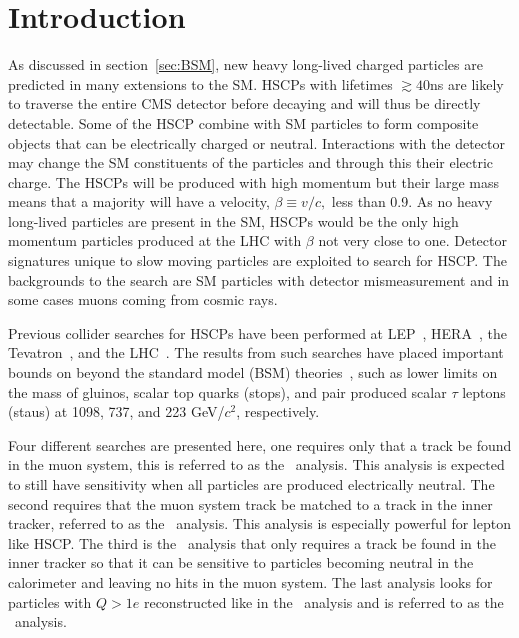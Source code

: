 \section{Introduction}
As discussed in section~\ref{sec:BSM}, new heavy long-lived charged particles are predicted in many extensions to the SM. HSCPs with
lifetimes $\gtrsim 40$ns are likely to traverse the entire CMS detector before decaying and will thus be directly detectable.
Some of the HSCP combine with SM particles to form composite objects that can be electrically charged or neutral.
Interactions with the detector may change the SM constituents of the particles and through this their electric charge.
The HSCPs will be produced with high momentum but their large mass means that
a majority will have a velocity, $\beta \equiv v/c,$ less than 0.9. 
As no heavy long-lived particles are present in the SM, HSCPs would be the only high momentum particles produced at the LHC with $\beta$ not very close to one.
Detector signatures unique to slow moving particles are exploited to search for HSCP. 
The backgrounds to the search are SM particles with detector mismeasurement and in some cases
muons coming from cosmic rays.

Previous collider searches for HSCPs have been performed at LEP~\cite{Barate:1997dr, Abreu:2000tn, Achard:2001qw, Abbiendi:2003yd}, HERA~\cite{Aktas:2004pq},
the Tevatron~\cite{Abazov:2008qu, Aaltonen:2009kea, Abazov:2011pf,Abazov:2012ab},
and the LHC~\cite{Khachatryan:2011ts, Aad:2011mb,  Aad:2011yf, Aad:2011hz, Chatrchyan::2012dr, Chatrchyan:2012sp, Aad:2012vd, ATLASmCHAMPs}.
The results from such searches have placed important bounds on beyond the standard model (BSM) theories~\cite{Berger:2008cq, CahillRowley:2012kx}, such as lower limits on the
mass of gluinos, scalar top quarks (stops), and pair produced scalar $\tau$ leptons (staus) at 1098,
737, and 223 GeV/$c^2$, respectively.

Four different searches are presented here, one requires only that a track be found in the muon system, this is referred to as the \muononly\ analysis. 
This analysis is expected to still have sensitivity when all particles are produced electrically neutral. The
second requires that the muon system track be matched to a track in the inner tracker, referred to as the \tktof\ analysis. This analysis is especially
powerful for lepton like HSCP. The third is the \tkonly\ analysis that only requires a track be found in the inner tracker so that it can be sensitive to particles
becoming neutral in the calorimeter and leaving no hits in the muon system. The last analysis looks for particles with $Q > 1e$ reconstructed
like in the \tktof\ analysis and is referred to as the \multi\ analysis.

